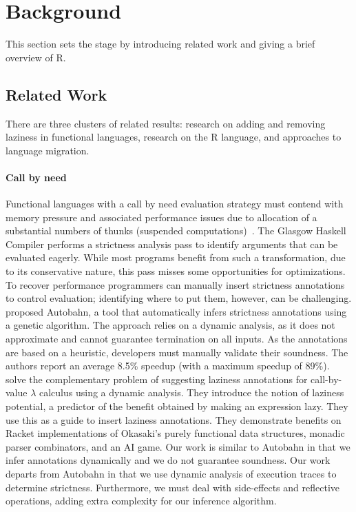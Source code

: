 \documentclass[review,nonacm,screen,acmsmall,anonymous=true]{acmart}
\begin{document}
\newpage
\section{Background}\label{sec:background}

This section sets the stage by introducing related work and giving a brief
overview of R.

\subsection{Related Work}

There are three clusters of related results: research on adding and removing
laziness in functional languages, research on the R language, and approaches to
language migration.

\paragraph{Call by need}  Functional languages with
a call by need evaluation strategy must contend with memory pressure and
associated performance issues due to allocation of a substantial numbers of
thunks (suspended computations)~\cite{transformopt,stricteffective,opteval}. The
Glasgow Haskell Compiler performs a strictness analysis pass to identify
arguments that can be evaluated eagerly. While most programs benefit from such a
transformation, due to its conservative nature, this pass misses some
opportunities for optimizations. To recover performance programmers can manually
insert strictness annotations to control evaluation; identifying where to put
them, however, can be challenging. \citet{autobahn} proposed Autobahn, a tool
that automatically infers strictness annotations using a genetic algorithm. The
approach relies on a dynamic analysis, as it does not approximate and cannot
guarantee termination on all inputs. As the annotations are based on a
heuristic, developers must manually validate their soundness. The authors report
an average 8.5\% speedup (with a maximum speedup of 89\%). \citet{lazyprof}
solve the complementary problem of suggesting laziness annotations for
call-by-value $\lambda$ calculus using a dynamic analysis. They introduce the
notion of laziness potential, a predictor of the benefit obtained by making an
expression lazy. They use this as a guide to insert laziness annotations. They
demonstrate benefits on Racket implementations of Okasaki's purely functional
data structures, monadic parser combinators, and an AI game. Our work is similar
to Autobahn in that we infer annotations dynamically and we do not guarantee
soundness. Our work departs from Autobahn in that we use dynamic analysis of
execution traces to determine strictness. Furthermore, we must deal with
side-effects and reflective operations, adding extra complexity for our
inference algorithm.
\end{document}
